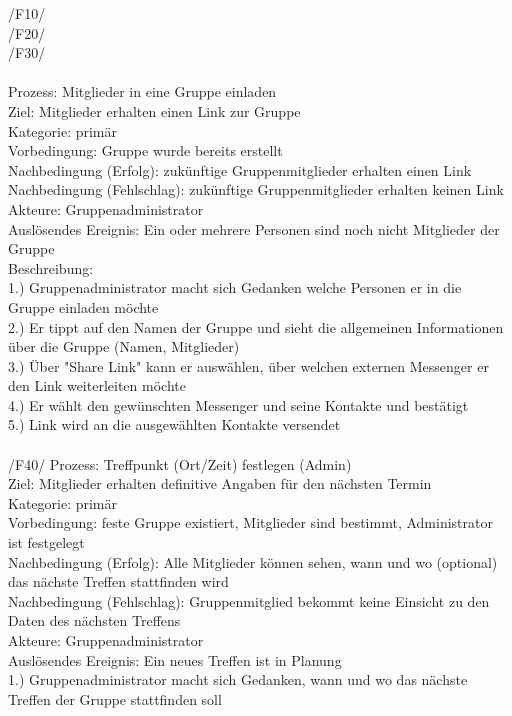 /F10/ \\
/F20/ \\
/F30/ \\ \\
Prozess: Mitglieder in eine Gruppe einladen\\
Ziel: Mitglieder erhalten einen Link zur Gruppe\\
Kategorie: primär\\
Vorbedingung: Gruppe wurde bereits erstellt\\
Nachbedingung (Erfolg): zukünftige Gruppenmitglieder erhalten einen Link\\
Nachbedingung (Fehlschlag): zukünftige Gruppenmitglieder erhalten keinen Link\\
Akteure: Gruppenadministrator\\
Auslösendes Ereignis: Ein oder mehrere Personen sind noch nicht Mitglieder der Gruppe\\
Beschreibung:\\
1.) Gruppenadministrator macht sich Gedanken welche Personen er in die Gruppe einladen möchte\\
2.) Er tippt auf den Namen der Gruppe und sieht die allgemeinen Informationen über die Gruppe (Namen, Mitglieder)\\
3.) Über "Share Link" kann er auswählen, über welchen externen Messenger er den Link weiterleiten möchte\\
4.) Er wählt den gewünschten Messenger und seine Kontakte und bestätigt\\
5.) Link wird an die ausgewählten Kontakte versendet\\ \\
/F40/ Prozess: Treffpunkt (Ort/Zeit) festlegen (Admin)\\
Ziel: Mitglieder erhalten definitive Angaben für den nächsten Termin\\
Kategorie: primär\\
Vorbedingung: feste Gruppe existiert, Mitglieder sind bestimmt, Administrator ist festgelegt\\
Nachbedingung (Erfolg): Alle Mitglieder können sehen, wann und wo (optional) das nächste Treffen stattfinden wird\\
Nachbedingung (Fehlschlag): Gruppenmitglied bekommt keine Einsicht zu den Daten des nächsten Treffens\\
Akteure: Gruppenadministrator\\
Auslösendes Ereignis: Ein neues Treffen ist in Planung\\
1.) Gruppenadministrator macht sich Gedanken, wann und wo das nächste Treffen der Gruppe stattfinden soll\\
